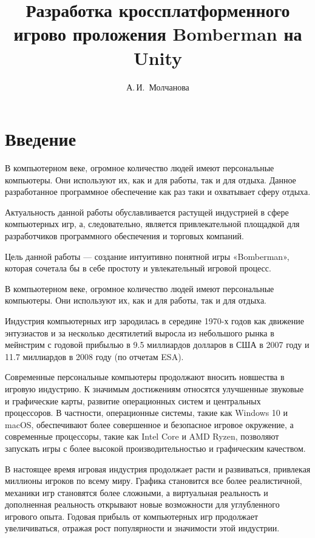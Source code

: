 \documentclass[14pt, oneside]{altsu-report}
\title{Разработка кроссплатформенного игрово проложения Bomberman на Unity}
\author{А.\,И.~Молчанова}
\institute{Институт цифровых технологий, электроники и физики}
\date{\the\year}
\begin{document}
\maketitle

\setcounter{page}{2}
\makeabstract
\tableofcontents

\chapter*{Введение}

В компьютерном веке, огромное количество людей имеют персональные компьютеры. Они используют их, как и для работы, так и для отдыха. Данное разработанное программное обеспечение как раз таки и охватывает сферу отдыха.

Актуальность данной работы обуславливается растущей индустрией в сфере компьютерных игр, а, следовательно, является привлекательной площадкой для разработчиков программного обеспечения и торговых компаний.

Цель данной работы --- создание интуитивно понятной игры «Bomberman», которая сочетала бы в себе простоту и увлекательный игровой процесс.

В компьютерном веке, огромное количество людей имеют персональные компьютеры. Они используют их, как и для работы, так и для отдыха.

Индустрия компьютерных игр зародилась в середине 1970-х годов как движение энтузиастов и за несколько десятилетий выросла из небольшого рынка в мейнстрим с годовой прибылью в 9.5 миллиардов долларов в США в 2007 году и 11.7 миллиардов в 2008 году (по отчетам ESA).

Современные персональные компьютеры продолжают вносить новшества в игровую индустрию. К значимым достижениям относятся улучшенные звуковые и графические карты, развитие операционных систем и центральных процессоров. В частности, операционные системы, такие как Windows 10 и macOS, обеспечивают более совершенное и безопасное игровое окружение, а современные процессоры, такие как Intel Core и AMD Ryzen, позволяют запускать игры с более высокой производительностью и графическим качеством.

В настоящее время игровая индустрия продолжает расти и развиваться, привлекая миллионы игроков по всему миру. Графика становится все более реалистичной, механики игр становятся более сложными, а виртуальная реальность и дополненная реальность открывают новые возможности для углубленного игрового опыта. Годовая прибыль от компьютерных игр продолжает увеличиваться, отражая рост популярности и значимости этой индустрии.
\end{document}
